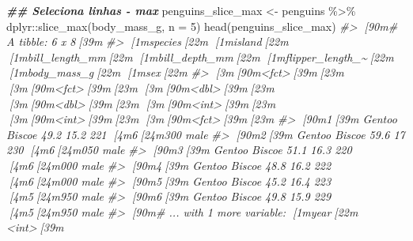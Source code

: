 \documentclass[
]{book}
\newenvironment{Shaded}{\begin{snugshade}}{\end{snugshade}}
\newcommand{\AttributeTok}[1]{\textcolor[rgb]{0.61,0.61,0.61}{#1}}
\newcommand{\CommentTok}[1]{\textcolor[rgb]{0.37,0.37,0.37}{\textit{#1}}}
\newcommand{\DecValTok}[1]{\textcolor[rgb]{0.06,0.06,0.06}{#1}}
\newcommand{\DocumentationTok}[1]{\textcolor[rgb]{0.37,0.37,0.37}{\textbf{\textit{#1}}}}
\newcommand{\FunctionTok}[1]{\textcolor[rgb]{0,0,0}{#1}}
\newcommand{\NormalTok}[1]{#1}
\newcommand{\OtherTok}[1]{\textcolor[rgb]{0.37,0.37,0.37}{#1}}
\newcommand{\SpecialCharTok}[1]{\textcolor[rgb]{0,0,0}{#1}}
\begin{document}
\begin{Shaded}
\begin{Highlighting}[]
\DocumentationTok{\#\# Seleciona linhas {-} max}
\NormalTok{penguins\_slice\_max }\OtherTok{\textless{}{-}}\NormalTok{ penguins }\SpecialCharTok{\%\textgreater{}\%} 
\NormalTok{  dplyr}\SpecialCharTok{::}\FunctionTok{slice\_max}\NormalTok{(body\_mass\_g, }\AttributeTok{n =} \DecValTok{5}\NormalTok{)}
\FunctionTok{head}\NormalTok{(penguins\_slice\_max)}
\CommentTok{\#\textgreater{} [90m\# A tibble: 6 x 8[39m}
\CommentTok{\#\textgreater{}   [1mspecies[22m [1misland[22m [1mbill\_length\_mm[22m [1mbill\_depth\_mm[22m [1mflipper\_length\_\textasciitilde{}[22m [1mbody\_mass\_g[22m [1msex[22m  }
\CommentTok{\#\textgreater{}   [3m[90m\textless{}fct\textgreater{}[39m[23m   [3m[90m\textless{}fct\textgreater{}[39m[23m           [3m[90m\textless{}dbl\textgreater{}[39m[23m         [3m[90m\textless{}dbl\textgreater{}[39m[23m            [3m[90m\textless{}int\textgreater{}[39m[23m       [3m[90m\textless{}int\textgreater{}[39m[23m [3m[90m\textless{}fct\textgreater{}[39m[23m}
\CommentTok{\#\textgreater{} [90m1[39m Gentoo  Biscoe           49.2          15.2              221        [4m6[24m300 male }
\CommentTok{\#\textgreater{} [90m2[39m Gentoo  Biscoe           59.6          17                230        [4m6[24m050 male }
\CommentTok{\#\textgreater{} [90m3[39m Gentoo  Biscoe           51.1          16.3              220        [4m6[24m000 male }
\CommentTok{\#\textgreater{} [90m4[39m Gentoo  Biscoe           48.8          16.2              222        [4m6[24m000 male }
\CommentTok{\#\textgreater{} [90m5[39m Gentoo  Biscoe           45.2          16.4              223        [4m5[24m950 male }
\CommentTok{\#\textgreater{} [90m6[39m Gentoo  Biscoe           49.8          15.9              229        [4m5[24m950 male }
\CommentTok{\#\textgreater{} [90m\# ... with 1 more variable: [1myear[22m \textless{}int\textgreater{}[39m}


\end{Highlighting}
\end{Shaded}
\end{document}
